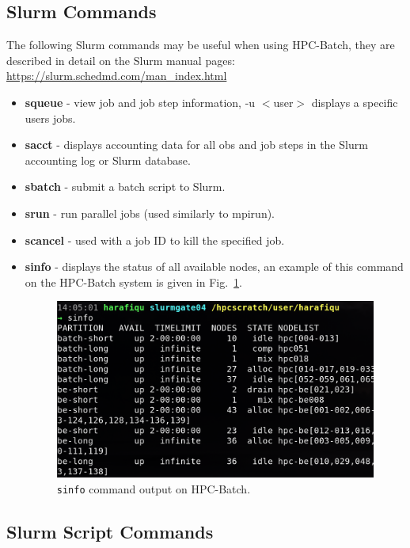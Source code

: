 \documentclass[a4paper]{cernatsnote}
\def \slurmman {\href{https://slurm.schedmd.com/man_index.html}{https://slurm.schedmd.com/man\_index.html}}
\begin{document}
\subsection{Slurm Commands}
\label{sec:SlurmCommands}

The following Slurm commands may be useful when using HPC-Batch, they are described in detail on the Slurm manual pages:
\slurmman

\begin{itemize}
	\item{\textbf{squeue}} - view job and job step information, -u $<$user$>$ displays a specific users jobs.
	\item{\textbf{sacct}} - displays accounting data for all obs and job steps in the Slurm accounting log or Slurm database.
	\item{\textbf{sbatch}} - submit a batch script to Slurm.
	\item{\textbf{srun}} - run parallel jobs (used similarly to mpirun).
	\item{\textbf{scancel}} - used with a job ID to kill the specified job.
	\item{\textbf{sinfo}} - displays the status of all available nodes, an example of this command on the HPC-Batch system is given in Fig.~\ref{fig:sinfo}.
		\begin{figure}		
			\centering
			\includegraphics[width=0.8\columnwidth]{sinfo.png}
			\caption{\texttt{sinfo} command output on HPC-Batch.}
			\label{fig:sinfo}
		\end{figure}
	
\end{itemize}

\subsection{Slurm Script Commands}
\label{sec:SlurmScriptCommands}
\end{document}
